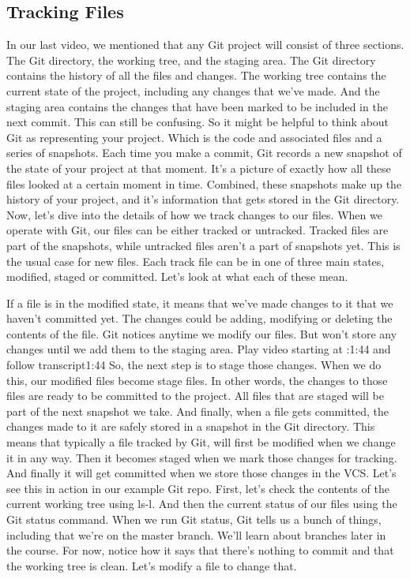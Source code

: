 	\subsection{Tracking Files}
	
	In our last video, we mentioned that any Git project will consist of three sections. The Git directory, the working tree, and the staging area. The Git directory contains the history of all the files and changes. The working tree contains the current state of the project, including any changes that we've made. And the staging area contains the changes that have been marked to be included in the next commit. This can still be confusing. So it might be helpful to think about Git as representing your project. Which is the code and associated files and a series of snapshots. Each time you make a commit, Git records a new snapshot of the state of your project at that moment. It's a picture of exactly how all these files looked at a certain moment in time. Combined, these snapshots make up the history of your project, and it's information that gets stored in the Git directory. Now, let's dive into the details of how we track changes to our files. When we operate with Git, our files can be either tracked or untracked. Tracked files are part of the snapshots, while untracked files aren't a part of snapshots yet. This is the usual case for new files. Each track file can be in one of three main states, modified, staged or committed. Let's look at what each of these mean.
	
	If a file is in the modified state, it means that we've made changes to it that we haven't committed yet. The changes could be adding, modifying or deleting the contents of the file. Git notices anytime we modify our files. But won't store any changes until we add them to the staging area.
	Play video starting at :1:44 and follow transcript1:44
	So, the next step is to stage those changes. When we do this, our modified files become stage files. In other words, the changes to those files are ready to be committed to the project. All files that are staged will be part of the next snapshot we take. And finally, when a file gets committed, the changes made to it are safely stored in a snapshot in the Git directory. This means that typically a file tracked by Git, will first be modified when we change it in any way. Then it becomes staged when we mark those changes for tracking. And finally it will get committed when we store those changes in the VCS. Let's see this in action in our example Git repo. First, let's check the contents of the current working tree using ls-l. And then the current status of our files using the Git status command. When we run Git status, Git tells us a bunch of things, including that we're on the master branch. We'll learn about branches later in the course. For now, notice how it says that there's nothing to commit and that the working tree is clean. Let's modify a file to change that.
	
